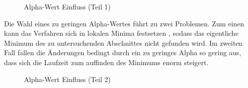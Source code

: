\begin{figure}[h!]
	\begin{center}
	\caption{Alpha-Wert Einfluss (Teil 1)}
	\label{alpha1}
	\end{center}
\end{figure}

Die Wahl eines zu geringen Alpha-Wertes führt zu zwei Problemen. Zum einen kann das Verfahren sich in lokalen Minima festsetzen , sodass das eigentliche Minimum des zu untersuchenden Abschnittes nicht gefunden wird. Im zweiten Fall  fallen die Änderungen bedingt durch ein zu geringes Alpha so gering aus, dass sich die Laufzeit zum auffinden des Minimums enorm steigert.

\begin{figure}[h!]
	\begin{center}
	\caption{Alpha-Wert Einfluss (Teil 2)}
	\label{alpha2}
	\end{center}
\end{figure}